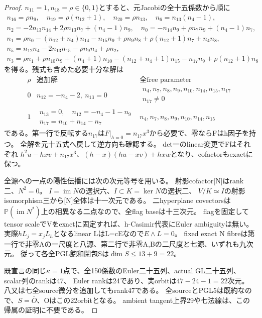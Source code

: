 \documentclass[a4paper,11pt]{ltjsarticle}
\theoremstyle{definition}
\begin{document}
\begin{proof}
$n_{11}=1,n_{18}=\rho\in\{0,1\}$とすると、元Jacobiの全十五係数から順に
\[
\begin{gathered}
 n_{16}=\rho n_9,\quad n_{19}=\rho(n_{12}+1),\quad n_{20}=\rho n_{13},\quad
 n_6=n_{13}(n_4-1),\\
 n_2=-2n_{13}n_{14}+2\rho n_{13}n_7+(n_4-1)n_9,\quad
 n_0=-n_{14}n_9+\rho n_7n_9+(n_4-1)n_7,\\
 n_1=\rho n_0-(n_{12}+n_4)n_{14}-n_{15}n_9+\rho n_9n_8+
       \rho(n_{12}+1)n_7+n_4n_8,\\
 n_5=n_{12}n_4-2n_{13}n_{15}-\rho n_9n_4+\rho n_2,\\
 n_3=\rho n_1+\rho n_{10}n_9+(n_4+1)n_{10}-(n_{12}+n_4+1)n_{15}
       -n_{17}n_9+\rho(n_{12}+1)n_8
\end{gathered}
\]
を得る。残式も含めた必要十分な解は
\[
\begin{array}{c|c|c}
 \rho&\text{追加解}&\text{全free parameter}\\\hline
 0&n_{12}=-n_4-2,\ n_{13}=0&
   \begin{gathered}n_4,n_7,n_8,n_9,n_{10},n_{14},n_{15},n_{17}\\n_{17}\ne0\end{gathered}\\
 1&\begin{gathered}n_{13}=0,\quad n_{12}=-n_4-1-n_9\\n_{17}=n_{10}+n_{14}-n_7\end{gathered}
    &n_4,n_7,n_8,n_9,n_{10},n_{14},n_{15}
\end{array}
\]
である。第一行で反転する$n_{17}$は$F|_{h=0}=n_{17}x^3$から必要で、零ならFはh因子を持つ。
全解を元十五式へ戻して逆方向も確認する。
det一のlinear変更でFはそれぞれ
$h^2u-hxv+n_{17}x^3$、$(h-x)(hu-xv)+hxw$となり、cofactorもexactに保つ。

全源への一点の陽性伝播には次の次元等号を用いる。
射影cofactor[N]はrank二、$N^2=0$。
$I=\operatorname{im}N$の選択六、$I\subset K=\ker N$の選択二、
$V/K\simeq I$の射影isomorphism三から[N]全体は十一次元である。
二hyperplane covectorsは$\mathbb P(\operatorname{im}N^*)$上の相異なる二点なので、全flag baseは十三次元。
flagを固定してtensor scaleでVをexactに固定すれば、h-Casimir代表にEuler ambiguityは無い。
実際$hL_j=x_jL_h$となるlinear LはL=cEなので$E\wedge L=0$。
fixed exact N fibreは第一行で非零Aの一尺度と八源、第二行で非零A,Bの二尺度と七源、いずれも九次元。
従って各全PGL飽和閉包Sは$\dim S\le13+9=22$。

既宣言の同じ$\kappa=1$点で、全150係数のEuler二十五列、actual GL二十五列、scalar列のrankは47、
Euler rankは24であり、実orbitは$47-24-1=22$次元。
八又は七全source微分を追加してもrank47である。
全sourceとPGL5は既約なので、$S=\overline O$、Oはこの22orbitとなる。
ambient tangent上界29や七法線は、この帰属の証明に不要である。


\end{proof}
\end{document}
